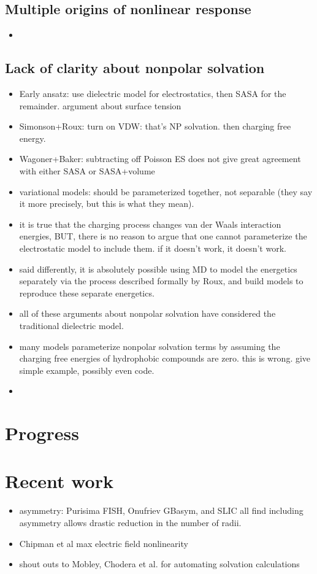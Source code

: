 \documentclass[reprint, letterpaper, nobibnotes, aps, superscriptaddress,prb]{revtex4-1}
\begin{document}
\subsection{Multiple origins of nonlinear response}
\begin{itemize}
\item 
\end{itemize}

\subsection{Lack of clarity about nonpolar solvation}
\begin{itemize}
\item Early ansatz: use dielectric model for electrostatics, then SASA for the remainder. argument about surface tension
\item Simonson+Roux: turn on VDW: that's NP solvation. then charging free energy.
\item Wagoner+Baker: subtracting off Poisson ES does not give great agreement with either SASA or SASA+volume
\item variational models: should be parameterized together, not separable (they say it more precisely, but this is what they mean).
\item it is true that the charging process changes van der Waals interaction energies, BUT, there is no reason to argue that one cannot parameterize the electrostatic model to include them. if it doesn't work, it doesn't work.
\item said differently, it is absolutely possible using MD to model the energetics separately via the process described formally by Roux, and build models to reproduce these separate energetics.
\item all of these arguments about nonpolar solvation have considered the traditional dielectric model.  
\item many models parameterize nonpolar solvation terms by assuming the charging free energies of hydrophobic compounds are zero. this is wrong. give simple example, possibly even code.
\item 
\end{itemize}

\section{Progress}


\section{Recent work}
\begin{itemize}
\item asymmetry: Purisima FISH, Onufriev GBasym, and SLIC all find including asymmetry allows drastic reduction in the number of radii.
\item Chipman et al max electric field nonlinearity
\item shout outs to Mobley, Chodera et al. for automating solvation calculations
\end{itemize}
\end{document}

